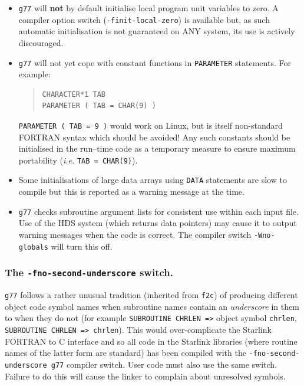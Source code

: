 \documentclass[twoside,11pt]{article}
\renewcommand{\_}{\texttt{\symbol{95}}}
\begin{document}
\begin{itemize}

\item \texttt{g77} will \textbf{not} by default initialise local program
unit variables to zero.  A compiler option switch (\texttt{-finit-local-zero})
is available but, as such automatic initialisation is not guaranteed on ANY
system, its use is actively discouraged.

\item \texttt{g77} will not yet cope with constant functions in
\texttt{PARAMETER} statements.  For example:

\begin{quote}
\begin{verbatim}
CHARACTER*1 TAB
PARAMETER ( TAB = CHAR(9) )
\end{verbatim}
\end{quote}

\texttt{PARAMETER ( TAB = 9 )} would work on Linux, but is itself
non-standard FORTRAN syntax which should be avoided!  Any such
constants should be initialised in the run--time code as a temporary
measure to ensure maximum portability (\emph{i.e.} \texttt{TAB~=~CHAR(9)}).

\item Some initialisations of large data arrays using \texttt{DATA}
statements are slow to compile but this is reported as a warning
message at the time.

\item \texttt{g77} checks subroutine argument lists for consistent use
within each input file.  Use of the HDS system (which returns data
pointers)  may cause it to output warning messages when the code is
correct.  The compiler switch \texttt{-Wno-globals} will turn this off.

\end{itemize}

\subsubsection{The \texttt{-fno-second-underscore} switch.}

\texttt{g77} follows a rather unusual tradition (inherited from
\texttt{f2c}) of producing different object code symbol names when
subroutine names contain an \textit{underscore} in them to when they do
not (for example \texttt{SUBROUTINE CHRLEN =>} object symbol
\texttt{chrlen\_}, \texttt{SUBROUTINE CHR\_LEN => chr\_len\_\_}).  This
would over-complicate the Starlink FORTRAN to C interface and so all
code in the Starlink libraries (where routine names of the latter form
are standard) has been compiled with the \texttt{-fno-second-underscore
g77} compiler switch.  User code must also use the same switch.
Failure to do this will cause the linker to complain about unresolved
symbols.
\end{document}
